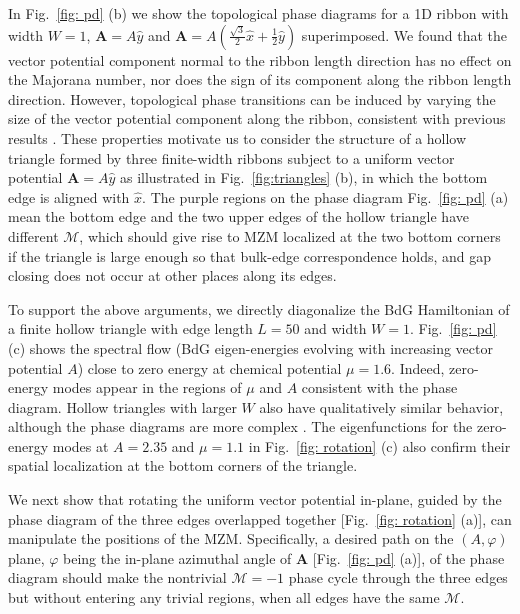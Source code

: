 In Fig.~\ref{fig: pd} (b) we show the topological phase diagrams for a 1D ribbon with width $W=1$, $\mathbf A = A\hat{y}$ and $\mathbf A = A(\frac{\sqrt{3}}{2}\hat{x}+\frac{1}{2}\hat{y})$ superimposed. We found that the vector potential component normal to the ribbon length direction has no effect on the Majorana number, nor does the sign of its component along the ribbon length direction. However, topological phase transitions can be induced by varying the size of the vector potential component along the ribbon, consistent with previous results \cite{romitoManipulatingMajoranaFermions2012, takasanSupercurrentinducedTopologicalPhase2022}. These properties motivate us to consider the structure of a hollow triangle formed by three finite-width ribbons subject to a uniform vector potential $\mathbf A = A\hat{y}$ as illustrated in Fig.~\ref{fig:triangles} (b), in which the bottom edge is aligned with $\hat{x}$. The purple regions on the phase diagram Fig.~\ref{fig: pd} (a) mean the bottom edge and the two upper edges of the hollow triangle have different $\mathcal{M}$, which should give rise to MZM localized at the two bottom corners if the triangle is large enough so that bulk-edge correspondence holds, and gap closing does not occur at other places along its edges.

To support the above arguments, we directly diagonalize the BdG Hamiltonian of a finite hollow triangle with edge length $L=50$ and width $W=1$. Fig.~\ref{fig: pd} (c) shows the spectral flow (BdG eigen-energies evolving with increasing vector potential $A$) close to zero energy at chemical potential $\mu=1.6$. Indeed, zero-energy modes appear in the regions of $\mu$ and $A$ consistent with the phase diagram. Hollow triangles with larger $W$ also have qualitatively similar behavior, although the phase diagrams are more complex \cite{supp}. The eigenfunctions for the zero-energy modes at $A=2.35$ and $\mu=1.1$ in Fig.~\ref{fig: rotation} (c) also confirm their spatial localization at the bottom corners of the triangle.

We next show that rotating the uniform vector potential in-plane, guided by the phase diagram of the three edges overlapped together [Fig.~\ref{fig: rotation} (a)], can manipulate the positions of the MZM. Specifically, a desired path on the $(A,\varphi)$ plane, $\varphi$ being the in-plane azimuthal angle of $\mathbf A$ [Fig.~\ref{fig: pd} (a)], of the phase diagram should make the nontrivial $\mathcal{M}=-1$ phase cycle through the three edges but without entering any trivial regions, when all edges have the same $\mathcal{M}$.

